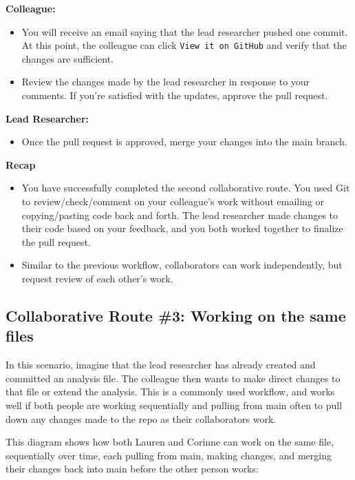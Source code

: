 \documentclass[
]{book}
\providecommand{\tightlist}{%
  \setlength{\itemsep}{0pt}\setlength{\parskip}{0pt}}
\begin{document}
\textbf{Colleague:}

\begin{itemize}
\tightlist
\item
  You will receive an email saying that the lead researcher pushed one commit. At this point, the colleague can click \texttt{View\ it\ on\ GitHub} and verify that the changes are sufficient.
\item
  Review the changes made by the lead researcher in response to your comments. If you're satisfied with the updates, approve the pull request.
\end{itemize}

\textbf{Lead Researcher:}

\begin{itemize}
\tightlist
\item
  Once the pull request is approved, merge your changes into the main branch.
\end{itemize}

\textbf{Recap}

\begin{itemize}
\item
  You have successfully completed the second collaborative route. You used Git to
  review/check/comment on your colleague's work without emailing
  or copying/pasting code back and forth. The lead researcher made changes to
  their code based on your feedback, and you both worked together to finalize the
  pull request.
\item
  Similar to the previous workflow, collaborators can work independently, but
  request review of each other's work.
\end{itemize}

\subsection{Collaborative Route \#3: Working on the same files}\label{collaborative-route-3-working-on-the-same-files}

In this scenario, imagine that the lead researcher has already created and
committed an analysis file. The colleague then wants to make direct changes to
that file or extend the analysis. This is a commonly used workflow,
and works well if both people are working sequentially and pulling from main
often to pull down any changes made to the repo as their collaborators work.

This diagram shows how both Lauren and Corinne can work on the same file,
sequentially over time, each pulling from main, making changes, and merging their
changes back into main before the other person works:
\end{document}
